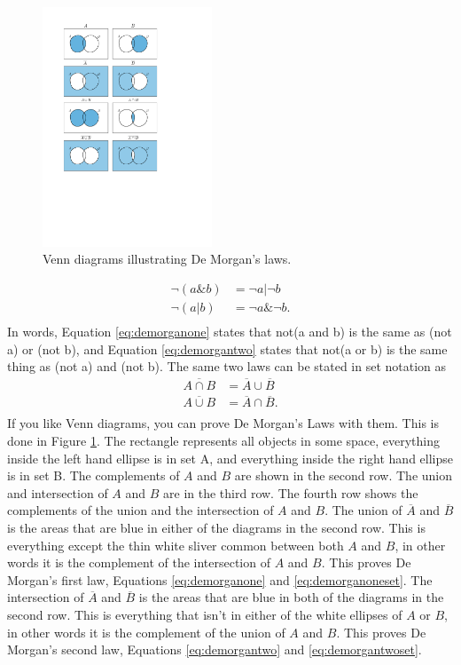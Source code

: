 \documentclass[../physical_computing.tex]{subfiles}
\begin{document}
\begin{figure}[h!]
    \centering
    \includegraphics[width=0.45\textwidth]{figures/venn_diagram_figure.pdf}
    \caption{\label{fig:venn_diagram_figure} Venn diagrams illustrating De Morgan's laws.}
\end{figure}

\begin{align}
\neg(a\&b) &= \neg a | \neg b
\label{eq:demorganone} \\
\neg(a|b)&=\neg a \& \neg b.
\label{eq:demorgantwo} \\
\nonumber
\end{align}
In words, Equation \ref{eq:demorganone} states that not(a and b) is the same as (not a) or (not b), and Equation \ref{eq:demorgantwo} states that not(a or b) is the same thing as (not a) and (not b). The same two laws can be stated in set notation as
\begin{align}
    \overline{A\cap B}&=\overline{A}\cup\overline{B}
    \label{eq:demorganoneset} \\
    \overline{A\cup B}&=\overline{A}\cap\overline{B}.
    \label{eq:demorgantwoset} \\ \nonumber
\end{align}
If you like Venn diagrams, you can prove De Morgan's Laws with them. This is done in Figure \ref{fig:venn_diagram_figure}. The rectangle represents all objects in some space, everything inside the left hand ellipse is in set A, and everything inside the right hand ellipse is in set B. The complements of $A$ and $B$ are shown in the second row. The union and intersection of $A$ and $B$ are in the third row. The fourth row shows the complements of the union and the intersection of $A$ and $B$. The union of $\overline{A}$ and $\overline{B}$ is the areas that are blue in either of the diagrams in the second row. This is everything except the thin white sliver common between both $A$ and $B$, in other words it is the complement of the intersection of $A$ and $B$. This proves De Morgan's first law, Equations \ref{eq:demorganone} and \ref{eq:demorganoneset}. The intersection of $\overline{A}$ and $\overline{B}$ is the areas that are blue in both of the diagrams in the second row. This is everything that isn't in either of the white ellipses of $A$ or $B$, in other words it is the complement of the union of $A$ and $B$. This proves De Morgan's second law, Equations \ref{eq:demorgantwo} and \ref{eq:demorgantwoset}.
\end{document}
